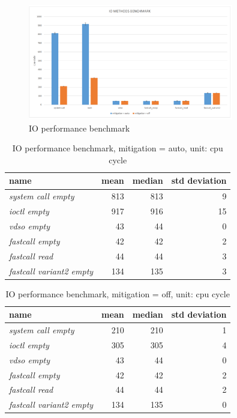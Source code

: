 \begin{figure}[H]
  \centering
  \includegraphics[width=0.8\textwidth]{images/IO_PERFORMANCE}
  \caption[IO performance benchmark]{IO performance benchmark}
   \label{fig:IO_PERFORMANCE}
\end{figure}

\begin{table}[htp]
  \centering
  \begin{tabular}{lrrr}
    \textbf{name} & \textbf{mean} & \textbf{median} & \textbf{std deviation} \\
    \hline
    \textit{system call empty} & 813 & 813 & 9\\
    \textit{ioctl empty} &917 & 916 & 15\\
    \textit{vdso empty} & 43 & 44 & 0\\
    \textit{fastcall empty} & 42 & 42 & 2\\
    \textit{fastcall read} & 44 & 44 & 3\\
    \textit{fastcall variant2 empty} & 134 & 135 & 3\\

  \end{tabular}
  \caption[IO performance benchmark, mitigation = auto]{IO performance benchmark, mitigation = auto, unit: cpu cycle}
  \label{tab:numbers}
\end{table}

\begin{table}[htp]
  \centering
  \begin{tabular}{lrrr}
    \textbf{name} & \textbf{mean} & \textbf{median} & \textbf{std deviation} \\
    \hline
    \textit{system call empty} & 210 & 210 & 1\\
    \textit{ioctl empty} &305 & 305 & 4\\
    \textit{vdso empty} & 43 & 44 & 0\\
    \textit{fastcall empty} & 42 & 42 & 2\\
    \textit{fastcall read} & 44 & 44 & 2\\
    \textit{fastcall variant2 empty} & 134 & 135 & 0\\

  \end{tabular}
  \caption[IO performance benchmark, mitigation = off]{IO performance benchmark, mitigation = off, unit: cpu cycle}
  \label{tab:number1}
\end{table}


